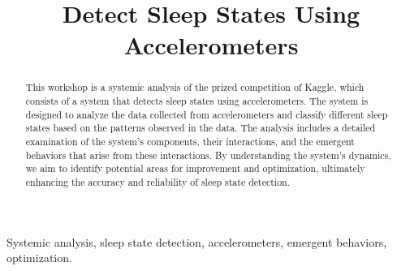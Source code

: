 \documentclass[conference]{IEEEtran}
\begin{document}
\title{Detect Sleep States Using Accelerometers}

\author{
    \and
    \and
}

\maketitle

\begin{abstract}
This workshop is a systemic analysis of the prized competition of Kaggle, which consists of a system that detects sleep states using accelerometers. The system is designed to analyze the data collected from accelerometers and classify different sleep states based on the patterns observed in the data. The analysis includes a detailed examination of the system's components, their interactions, and the emergent behaviors that arise from these interactions. By understanding the system's dynamics, we aim to identify potential areas for improvement and optimization, ultimately enhancing the accuracy and reliability of sleep state detection.
\end{abstract}

\begin{IEEEkeywords}
Systemic analysis, sleep state detection, accelerometers, emergent behaviors, optimization.
\end{IEEEkeywords}
\end{document}
